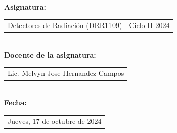 \begin{titlepage}
{\textbf{Asignatura:}
\vspace*{0.1cm}

\begin{tabular}[t]{lr}
Detectores de Radiación (DRR1109) & Ciclo II 2024 
\end{tabular}
\\[0.5cm]

\textbf{\large{Docente de la asignatura:}}

\begin{tabular}[t]{c}
Lic. Melvyn Jose Hernandez Campos
\end{tabular}
\\[0.5cm]

\textbf{\large{Fecha:}}

\begin{tabular}[t]{c}
Jueves, 17 de octubre de 2024
\end{tabular}

}
\end{titlepage}

\newpage

